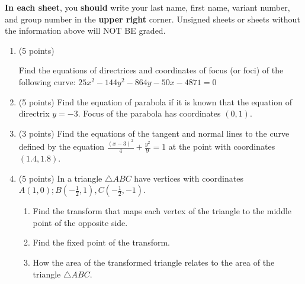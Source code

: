 \documentclass[]{exam}
\begin{document}
\begin{flushleft}
    \textbf{In each sheet}, you \textbf{should} write your last name, first name, variant number, and group number in the \textbf{upper right} corner. Unsigned sheets or sheets without the information above will NOT BE graded.
\end{flushleft}

\begin{enumerate}


\item (5 points) 

Find the equations of directrices and coordinates of focus (or foci) of the following curve:
$25x^2 - 144y^2 - 864y - 50x - 4871=0$

\item (5 points) 
Find the equation of parabola if it is known that the equation of directrix $y=-3$. Focus of the parabola has coordinates $(0,1)$.


\item (3 points)
Find the equations of the tangent and normal lines to the curve defined by the equation $\frac{(x-3)^2}{4}+\frac{y^2}{9}=1$ at the point with coordinates $(1.4,1.8)$.

\item (5 points)
In a triangle $\bigtriangleup ABC$ have vertices with coordinates $A(1,0); B(-\frac{1}{2},1), C(-\frac{1}{2},-1)$. 

\begin{enumerate}

\item Find the transform that maps each vertex of the triangle to the middle point of the opposite side. 

\item Find the fixed point of the transform.

\item How the area of the transformed triangle relates to the area of the triangle $\bigtriangleup ABC$.
\end{enumerate}

\end{enumerate}
\end{document}
